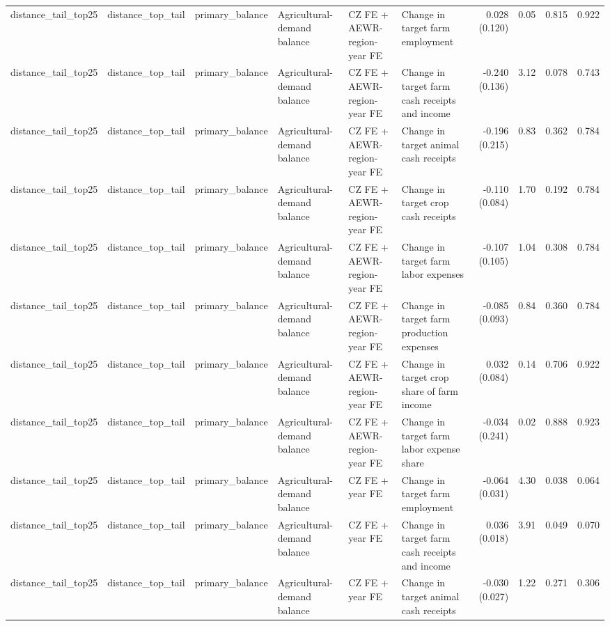 \begin{tabular}{llllllrrrr}
distance_tail_top25 & distance_top_tail & primary_balance & Agricultural-demand balance & CZ FE + AEWR-region-year FE & Change in target farm employment & 0.028 (0.120) & 0.05 & 0.815 & 0.922 \\
distance_tail_top25 & distance_top_tail & primary_balance & Agricultural-demand balance & CZ FE + AEWR-region-year FE & Change in target farm cash receipts and income & -0.240 (0.136) & 3.12 & 0.078 & 0.743 \\
distance_tail_top25 & distance_top_tail & primary_balance & Agricultural-demand balance & CZ FE + AEWR-region-year FE & Change in target animal cash receipts & -0.196 (0.215) & 0.83 & 0.362 & 0.784 \\
distance_tail_top25 & distance_top_tail & primary_balance & Agricultural-demand balance & CZ FE + AEWR-region-year FE & Change in target crop cash receipts & -0.110 (0.084) & 1.70 & 0.192 & 0.784 \\
distance_tail_top25 & distance_top_tail & primary_balance & Agricultural-demand balance & CZ FE + AEWR-region-year FE & Change in target farm labor expenses & -0.107 (0.105) & 1.04 & 0.308 & 0.784 \\
distance_tail_top25 & distance_top_tail & primary_balance & Agricultural-demand balance & CZ FE + AEWR-region-year FE & Change in target farm production expenses & -0.085 (0.093) & 0.84 & 0.360 & 0.784 \\
distance_tail_top25 & distance_top_tail & primary_balance & Agricultural-demand balance & CZ FE + AEWR-region-year FE & Change in target crop share of farm income & 0.032 (0.084) & 0.14 & 0.706 & 0.922 \\
distance_tail_top25 & distance_top_tail & primary_balance & Agricultural-demand balance & CZ FE + AEWR-region-year FE & Change in target farm labor expense share & -0.034 (0.241) & 0.02 & 0.888 & 0.923 \\
distance_tail_top25 & distance_top_tail & primary_balance & Agricultural-demand balance & CZ FE + year FE & Change in target farm employment & -0.064 (0.031) & 4.30 & 0.038 & 0.064 \\
distance_tail_top25 & distance_top_tail & primary_balance & Agricultural-demand balance & CZ FE + year FE & Change in target farm cash receipts and income & 0.036 (0.018) & 3.91 & 0.049 & 0.070 \\
distance_tail_top25 & distance_top_tail & primary_balance & Agricultural-demand balance & CZ FE + year FE & Change in target animal cash receipts & -0.030 (0.027) & 1.22 & 0.271 & 0.306 \\

\end{tabular}
